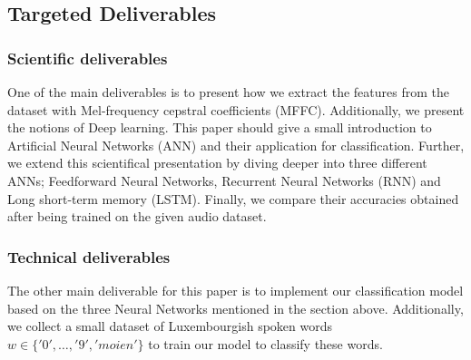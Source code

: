 
\subsection{Targeted Deliverables}

\subsubsection{Scientific deliverables}



One of the main deliverables is to present how we extract the features from the
dataset with Mel-frequency cepstral coefficients (MFFC). Additionally, we
present the notions of Deep learning. This paper should give a small
introduction to Artificial Neural Networks (ANN) and their application for
classification. Further, we extend this scientifical presentation by diving
deeper into three different ANNs; Feedforward Neural Networks, Recurrent Neural
Networks (RNN) and Long short-term memory (LSTM). Finally, we compare their
accuracies obtained after being trained on the given audio dataset.

\subsubsection{Technical deliverables} 

The other main deliverable for this paper is to implement our classification
model based on the three Neural Networks mentioned in the section above.
Additionally, we collect a small dataset of Luxembourgish spoken words $w \in
\{'0',\dots,'9','moien'\}$ to train our model to classify these words.
